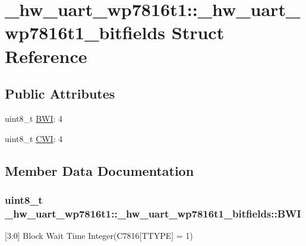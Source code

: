 \hypertarget{struct__hw__uart__wp7816t1_1_1__hw__uart__wp7816t1__bitfields}{}\section{\+\_\+hw\+\_\+uart\+\_\+wp7816t1\+:\+:\+\_\+hw\+\_\+uart\+\_\+wp7816t1\+\_\+bitfields Struct Reference}
\label{struct__hw__uart__wp7816t1_1_1__hw__uart__wp7816t1__bitfields}
\subsection*{Public Attributes}
\begin{DoxyCompactItemize}
\item 
uint8\+\_\+t \hyperlink{struct__hw__uart__wp7816t1_1_1__hw__uart__wp7816t1__bitfields_a5b1974f59c0adecf06ea1fbde5cf861b}{B\+WI}\+: 4
\item 
uint8\+\_\+t \hyperlink{struct__hw__uart__wp7816t1_1_1__hw__uart__wp7816t1__bitfields_a89bf640feb8f976eb2ff56b277e8bd06}{C\+WI}\+: 4
\end{DoxyCompactItemize}


\subsection{Member Data Documentation}
\subsubsection[{\texorpdfstring{B\+WI}{BWI}}]{\setlength{\rightskip}{0pt plus 5cm}uint8\+\_\+t \+\_\+hw\+\_\+uart\+\_\+wp7816t1\+::\+\_\+hw\+\_\+uart\+\_\+wp7816t1\+\_\+bitfields\+::\+B\+WI}\hypertarget{struct__hw__uart__wp7816t1_1_1__hw__uart__wp7816t1__bitfields_a5b1974f59c0adecf06ea1fbde5cf861b}{}\label{struct__hw__uart__wp7816t1_1_1__hw__uart__wp7816t1__bitfields_a5b1974f59c0adecf06ea1fbde5cf861b}
\mbox{[}3\+:0\mbox{]} Block Wait Time Integer(C7816\mbox{[}T\+T\+Y\+PE\mbox{]} = 1) 
